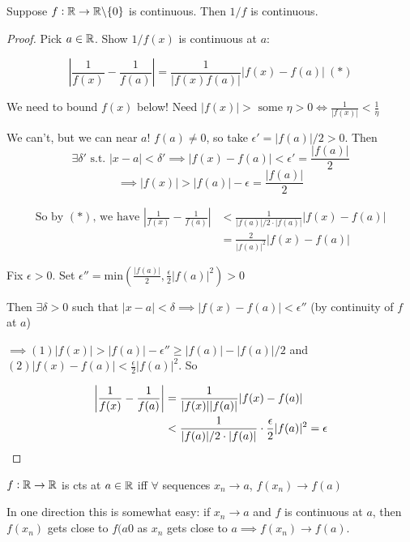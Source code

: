 \documentclass[twoside]{scrartcl}
\begin{document}
\begin{example}
Suppose $f:\mathbb{R}\to \mathbb{R}\backslash\{0\}$ is continuous. Then $1/f$ is continuous. 

\begin{proof}
Pick $a\in\mathbb{R}$. Show $1/f(x)$ is continuous at $a$: 

\[\left|\frac{1}{f(x)} - \frac{1}{f(a)}\right|  = \frac{1}{|f(x)f(a)|}|f(x)-f(a)| ~(*)\]

We need to bound $f(x)$ below! Need $|f(x)| > \text{ some }\eta > 0 \iff \frac{1}{|f(x)|} < \frac{1}{\eta}$

We can't, but we can near $a$! $f(a) \neq 0$, so take $\epsilon' = |f(a)|/2 >0$. Then 
\[\exists \delta' \text{ s.t. } |x-a| < \delta' \implies|f(x) - f(a)| < \epsilon' = \frac{|f(a)|}{2}\]
\[\implies |f(x)| > |f(a)| -\epsilon = \frac{|f(a)|}{2}\]


\[\begin{aligned}
\text{So by } (*) \text{, we have }\left|\frac{1}{f(x)} - \frac{1}{f(a)}\right| &< \frac{1}{|f(a)|/2\cdot |f(a)|} |f(x) - f(a)| \\ 
	& = \frac{2}{|f(a)|^2}|f(x) - f(a)|
\end{aligned}
\]

Fix $\epsilon >0$. Set $\epsilon'' = \mathrm{min}\left(\frac{|f(a)|}{2}, \frac{\epsilon}{2}|f(a)|^2\right) > 0$

Then $\exists \delta > 0$ such that $|x-a| < \delta \implies |f(x) - f(a)| < \epsilon''$ (by continuity of $f$ at $a$)

$\implies (1) |f(x)| > |f(a)| - \epsilon'' \geq |f(a)| - |f(a)|/2$ and $(2) |f(x) - f(a)| < \frac{\epsilon}{2}|f(a)|^2$. So 

\[\begin{aligned}
\left|\frac{1}{f(x)} - \frac{1}{f(a)}\right| &= \frac{1}{|f(x)||f(a)|} |f(x) -f(a)| \\
&< \frac{1}{|f(a)|/2\cdot|f(a)|}\cdot \frac{\epsilon}{2}|f(a)|^2 = \epsilon	\qedhere
\end{aligned}
\]
\end{proof}	
\end{example}


\begin{theorem}
	$f: \mathbb{R} \to \mathbb{R}$ is cts at $a \in \mathbb{R}$ iff $\forall$ sequences $x_n \to a$, $f(x_n) \to f(a)$
\end{theorem}

In one direction this is somewhat easy: if $x_n \to a$ and $f$ is continuous at $a$, then $f(x_n)$ gets close to $f(a0$ as $x_n$ gets close to $a \implies f(x_n) \to f(a)$. 
\end{document}
